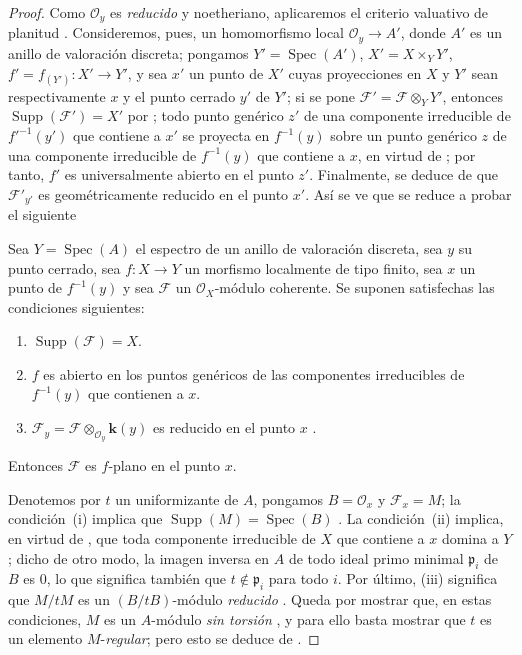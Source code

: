 \begin{proof}
\label{IV.15.2.2-proof}
Como $\mathcal O_y$ es \emph{reducido} y noetheriano, aplicaremos el criterio valuativo de planitud .
Consideremos, pues, un homomorfismo local $\mathcal O_y\to A'$, donde $A'$ es un anillo de valoración discreta; pongamos $Y'=\operatorname{Spec}(A')$, $X'=X\times_Y Y'$, $f'=f_{(Y')}:X'\to Y'$, y sea $x'$ un punto de $X'$ cuyas proyecciones en $X$ y $Y'$ sean respectivamente $x$ y el punto cerrado $y'$ de $Y'$; si se pone $\mathcal F'=\mathcal F\otimes_Y Y'$, entonces $\operatorname{Supp}(\mathcal F')=X'$ por ; todo punto genérico $z'$ de una componente irreducible de $f'^{-1}(y')$ que contiene a $x'$ se proyecta en $f^{-1}(y)$ sobre un punto genérico $z$ de una componente irreducible de $f^{-1}(y)$ que contiene a $x$, en virtud de ; por tanto, $f'$ es universalmente abierto en el punto $z'$.
Finalmente, se deduce de  que $\mathcal F'_{y'}$ es geométricamente reducido en el punto $x'$.
Así se ve que se reduce a probar el siguiente

\begin{lemma}[15.2.2.1]
\label{IV.15.2.2.1}
Sea $Y=\operatorname{Spec}(A)$ el espectro de un anillo de valoración discreta, sea $y$ su punto cerrado, sea $f:X\to Y$ un morfismo localmente de tipo finito, sea $x$ un punto de $f^{-1}(y)$ y sea $\mathcal F$ un $\mathcal O_X$-módulo coherente.
Se suponen satisfechas las condiciones siguientes:
\begin{enumerate}[label=\textup{(\roman*)}]
  \item $\operatorname{Supp}(\mathcal F)=X$.
  \item $f$ es abierto en los puntos genéricos de las componentes irreducibles de $f^{-1}(y)$ que contienen a $x$.
  \item $\mathcal F_y=\mathcal F\otimes_{\mathcal O_y}\boldsymbol{k}(y)$ es reducido en el punto $x$ .
\end{enumerate}
Entonces $\mathcal F$ es $f$-plano en el punto $x$.
\end{lemma}

Denotemos por $t$ un uniformizante de $A$, pongamos $B=\mathcal O_x$ y $\mathcal F_x=M$; la condición~(i) implica que $\operatorname{Supp}(M)=\operatorname{Spec}(B)$ .
La condición~(ii) implica, en virtud de , que toda componente irreducible de $X$ que contiene a $x$ domina a $Y$; dicho de otro modo, la imagen inversa en $A$ de todo ideal primo minimal $\mathfrak p_i$ de $B$ es $0$, lo que significa también que $t\notin\mathfrak p_i$ para todo $i$. Por último, (iii) significa que $M/tM$ es un $(B/tB)$-módulo \emph{reducido} .
Queda por mostrar que, en estas condiciones, $M$ es un $A$-módulo \emph{sin torsión} , y para ello basta mostrar que $t$ es un elemento $M$-\emph{regular}; pero esto se deduce de .
\end{proof}


